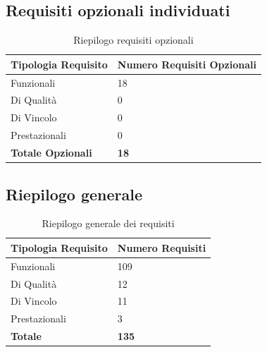 \subsection{Requisiti opzionali individuati}
\begin{table}[htbp]
	\centering
	\caption{Riepilogo requisiti opzionali}
	\label{tab:riepilogo-opzionali}
	\renewcommand{\arraystretch}{1.3}
	\small
	\begin{tabularx}{0.8\textwidth}{|p{4.5cm}|X|}
		\hline
		\rowcolor[gray]{0.88}
		\textbf{Tipologia Requisito} & \textbf{Numero Requisiti Opzionali} \\
		\hline
		Funzionali & 18 \\ \hline
		Di Qualit\`a & 0 \\ \hline
		Di Vincolo & 0 \\ \hline
		Prestazionali & 0 \\ \hline
		\textbf{Totale Opzionali} & \textbf{18} \\ \hline
	\end{tabularx}
\end{table}

\newpage
\subsection{Riepilogo generale}
\begin{table}[htbp]
	\centering
	\caption{Riepilogo generale dei requisiti}
	\label{tab:riepilogo-generale}
	\renewcommand{\arraystretch}{1.3}
	\small
	\begin{tabularx}{0.8\textwidth}{|p{4.5cm}|X|}
		\hline
		\rowcolor[gray]{0.88}
		\textbf{Tipologia Requisito} & \textbf{Numero Requisiti} \\
		\hline
		Funzionali & 109 \\ \hline
		Di Qualit\`a & 12 \\ \hline
		Di Vincolo & 11 \\ \hline
		Prestazionali & 3 \\ \hline
		\textbf{Totale} & \textbf{135} \\ \hline
	\end{tabularx}
\end{table}